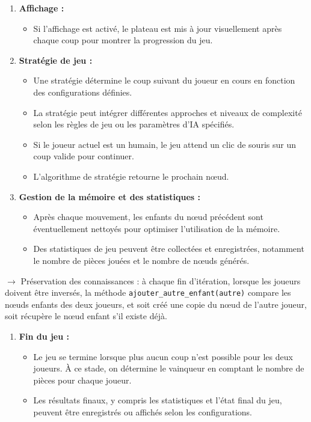 \begin{enumerate}[resume]
    \item \textbf{Affichage :}
    \begin{itemize}
        \item Si l'affichage est activé, le plateau est mis à jour visuellement après chaque coup pour montrer la progression du jeu.
    \end{itemize}
    
    \item \textbf{Stratégie de jeu :}
    \begin{itemize}
        \item Une stratégie détermine le coup suivant du joueur en cours en fonction des configurations définies.
        \item La stratégie peut intégrer différentes approches et niveaux de complexité selon les règles de jeu ou les paramètres d'IA spécifiés.
        \item Si le joueur actuel est un humain, le jeu attend un clic de souris sur un coup valide pour continuer.
        \item L'algorithme de stratégie retourne le prochain nœud.
    \end{itemize}

    \item \textbf{Gestion de la mémoire et des statistiques :}
    \begin{itemize}
        \item Après chaque mouvement, les enfants du nœud précédent sont éventuellement nettoyés pour optimiser l'utilisation de la mémoire.
        \item Des statistiques de jeu peuvent être collectées et enregistrées, notamment le nombre de pièces jouées et le nombre de nœuds générés.
    \end{itemize}
\end{enumerate}
$\rightarrow$ Préservation des connaissances : à chaque fin d'itération, lorsque les joueurs doivent être inversés, la méthode \texttt{ajouter\_autre\_enfant(autre)} compare les nœuds enfants des deux joueurs, et soit créé une copie du nœud de l'autre joueur, soit récupère le nœud enfant s'il existe déjà.
\begin{enumerate}[resume]
    \item \textbf{Fin du jeu :}
    \begin{itemize}
        \item Le jeu se termine lorsque plus aucun coup n'est possible pour les deux joueurs. À ce stade, on détermine le vainqueur en comptant le nombre de pièces pour chaque joueur.
        \item Les résultats finaux, y compris les statistiques et l'état final du jeu, peuvent être enregistrés ou affichés selon les configurations.
    \end{itemize}
\end{enumerate}

